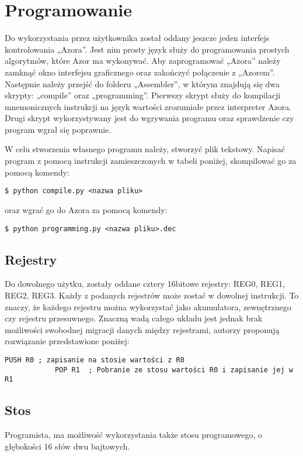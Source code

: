 \section{Programowanie}
    \tab Do wykorzystania przez użytkownika został oddany jeszcze jeden interfejs kontrolowania „Azora”.
    Jest nim prosty język służy do programowania prostych algorytmów, które Azor ma wykonywać.
    Aby zaprogramować „Azora” należy zamknąć okno interfejsu graficznego oraz zakończyć połączenie z „Azorem”. 
    Następnie należy przejść do folderu „Assembler”, w którym znajdują się dwa skrypty: „compile” oraz „programming”.
    Pierwszy skrypt służy do kompilacji mnemonicznych instrukcji na język wartości zrozumiałe przez interpreter Azora.
    Drugi skrypt wykorzystywany jest do wgrywania programu oraz sprawdzenie czy program wgrał się poprawnie.

    W celu stworzenia własnego programu należy, stworzyć plik tekstowy. Napisać program z pomocą instrukcji zamieszczonych w tabeli poniżej, skompilować go za pomocą komendy:
    \begin{lstlisting}[gobble = 8, frame = L]
        $ python compile.py <nazwa pliku>
    \end{lstlisting}
    oraz wgrać go do Azora za pomocą komendy:
    \begin{lstlisting}[gobble = 8, frame = L]
        $ python programming.py <nazwa pliku>.dec
    \end{lstlisting}


    \subsection{Rejestry}
        \tab Do dowolnego użytku, zostały oddane cztery 16bitowe rejestry: REG0, REG1, REG2, REG3.
        Każdy z podanych rejestrów może zostać w dowolnej instrukcji.
        To znaczy, że każdego rejestru można wykorzystać jako akumulatora, zewnętrznego czy rejestru przesuwnego.
        Znaczną wadą całego układu jest jednak brak możliwości swobodnej migracji danych między rejestrami, autorzy proponują rozwiązanie przedstawione poniżej:
        \begin{lstlisting}[gobble = 8, frame = L, caption={Skopiowanie wartości z Rejestru 0 do Rejestru 1}, captionpos=b]
            PUSH R0 ; zapisanie na stosie wartości z R0
            POP R1  ; Pobranie ze stosu wartości R0 i zapisanie jej w R1
        \end{lstlisting}

    \subsection{Stos}
        \tab Programista, ma możliwość wykorzystania także stosu programowego, o głębokości 16 słów dwu bajtowych.

